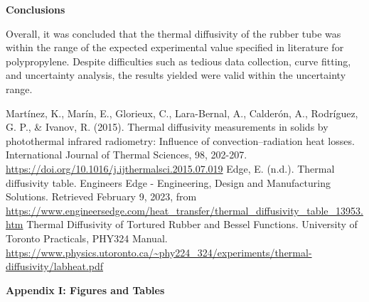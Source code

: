 \documentclass[11pt]{article}
\begin{document}
\begin{multicols}{2}
    \vspace{10pt}

     \selectfont \textbf{Conclusions}
    
     \selectfont Overall, it was concluded that the thermal diffusivity of the rubber tube was within the range of the expected experimental value specified in literature for polypropylene. Despite difficulties such as tedious data collection, curve fitting, and uncertainty analysis, the results yielded were valid within the uncertainty range.    



\end{multicols}

    \vspace{10pt}
     
     \selectfont

    \begin{thebibliography}{} \selectfont
         Martínez, K., Marín, E., Glorieux, C., Lara-Bernal, A., Calderón, A., Rodríguez, G. P., \& Ivanov, R. (2015). Thermal diffusivity measurements in solids by photothermal infrared radiometry: Influence of convection–radiation heat losses. International Journal of Thermal Sciences, 98, 202-207.
                    \color{blue}\url{https://doi.org/10.1016/j.ijthermalsci.2015.07.019}\color{black}
         Edge, E. (n.d.). Thermal diffusivity table. Engineers Edge - Engineering, Design and Manufacturing Solutions. Retrieved February 9, 2023, from 
                    \color{blue}\url{https://www.engineersedge.com/heat_transfer/thermal_diffusivity_table_13953.htm} \color{black}
         Thermal Diffusivity of Tortured Rubber and Bessel Functions. University of Toronto Practicals, PHY324 Manual. 
                    \color{blue}\url{https://www.physics.utoronto.ca/~phy224_324/experiments/thermal-diffusivity/labheat.pdf}\color{black}
    \end{thebibliography}




    \pagebreak 



     \selectfont \textbf{Appendix I: Figures and Tables}
    
     \selectfont
\end{document}
